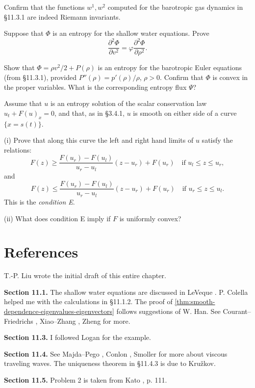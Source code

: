\begin{exercise}
Confirm that the functions $w^1, w^2$ computed for the barotropic gas dynamics in \S11.3.1 are indeed Riemann invariants.
\end{exercise}

\begin{exercise}
Suppose that $\Phi$ is an entropy for the shallow water equations. Prove
$$\frac{\partial^2\Phi}{\partial v^2} = \varphi\frac{\partial^2\Phi}{\partial\rho^2}.$$
\end{exercise}

\begin{exercise}
Show that $\Phi = \rho v^2/2 + P(\rho)$ is an entropy for the barotropic Euler equations (from \S11.3.1), provided $P''(\rho) = p'(\rho)/\rho$, $\rho>0$. Confirm that $\Phi$ is convex in the proper variables. What is the corresponding entropy flux $\Psi$?
\end{exercise}

\begin{exercise}
Assume that $u$ is an entropy solution of the scalar conservation law $u_t + F(u)_x = 0$, and that, as in \S3.4.1, $u$ is smooth on either side of a curve $\{x=s(t)\}$.

(i) Prove that along this curve the left and right hand limits of $u$ satisfy the relations:
$$F(z) \geq \frac{F(u_r)-F(u_l)}{u_r-u_l}(z-u_r) + F(u_r) \quad \text{if } u_l \leq z \leq u_r,$$
and
$$F(z) \leq \frac{F(u_r)-F(u_l)}{u_r-u_l}(z-u_r) + F(u_r) \quad \text{if } u_r \leq z \leq u_l.$$
This is the \textit{condition E}.

(ii) What does condition E imply if $F$ is uniformly convex?
\end{exercise}

\section{References}\label{sec:chapter11-references}

T.-P. Liu wrote the initial draft of this entire chapter.

\textbf{Section 11.1.} The shallow water equations are discussed in LeVeque \cite{LeVeque1992}. P. Colella helped me with the calculations in \S11.1.2. The proof of \cref{thm:smooth-dependence-eigenvalues-eigenvectors} follows suggestions of W. Han. See Courant--Friedrichs \cite{CourantFriedrichs1976}, Xiao--Zhang \cite{XiaoZhang1989}, Zheng \cite{Zheng2001} for more.

\textbf{Section 11.3.} I followed Logan \cite{Logan1987} for the example.

\textbf{Section 11.4.} See Majda--Pego \cite{MajdaPego1985}, Conlon \cite{Conlon1980}, Smoller \cite{Smoller1983} for more about viscous traveling waves. The uniqueness theorem in \S11.4.3 is due to Kru\v{z}kov.

\textbf{Section 11.5.} Problem 2 is taken from Kato \cite{Kato1980}, p. 111.
